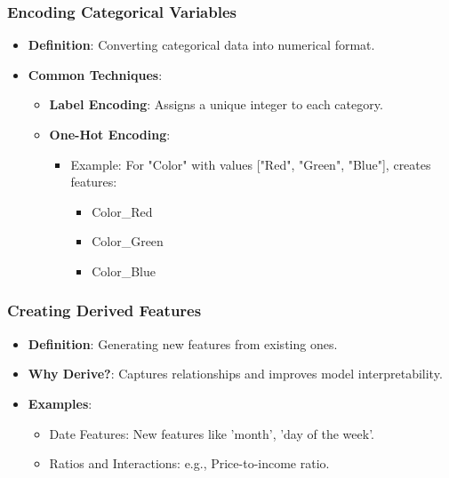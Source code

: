 \documentclass[aspectratio=169]{beamer}
\begin{document}
\begin{frame}
    \frametitle{Encoding Categorical Variables}
    \begin{itemize}
        \item \textbf{Definition}: Converting categorical data into numerical format.
        \item \textbf{Common Techniques}:
        \begin{itemize}
            \item \textbf{Label Encoding}: Assigns a unique integer to each category.
            \item \textbf{One-Hot Encoding}:
            \begin{itemize}
                \item Example: For "Color" with values ["Red", "Green", "Blue"], creates features:
                \begin{itemize}
                    \item Color\_Red
                    \item Color\_Green
                    \item Color\_Blue
                \end{itemize}
            \end{itemize}
        \end{itemize}
    \end{itemize}
\end{frame}

\begin{frame}
    \frametitle{Creating Derived Features}
    \begin{itemize}
        \item \textbf{Definition}: Generating new features from existing ones.
        \item \textbf{Why Derive?}: Captures relationships and improves model interpretability.
        \item \textbf{Examples}:
        \begin{itemize}
            \item Date Features: New features like 'month', 'day of the week'.
            \item Ratios and Interactions: e.g., Price-to-income ratio.
        \end{itemize}
    \end{itemize}
\end{frame}
\end{document}
